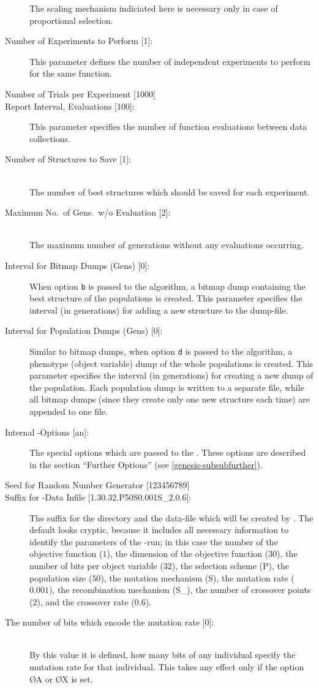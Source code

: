 \begin{description}
	The scaling mechanism indiciated here is necessary only in case of
	proportional selection.
%
\item[	Number of Experiments to Perform {[1]}:]
	This parameter defines the number of independent experiments 
	to perform for the same function.
%
\item[	Number of Trials per Experiment {[1000]}]
%
\item[	Report Interval, Evaluations {[100]}:]
	This parameter specifies the number of function evaluations
	between data collections.
%
\item[	Number of Structures to Save {[1]}:]
	\ifUS
	\mbox{}\\
	\fi
	The number of best structures which should be saved for each 
	experiment.
%
\item[	Maximum No.~of Gens.~w/o Evaluation {[2]}:] 	
	\ifUS
	\mbox{}\\
	\fi
	The maximum number of generations with\-out any evaluations occurring.
%
\item[ 	Interval for Bitmap Dumps (Gens) {[0]}:]
	When option \verb/b/ is passed to the algorithm, a bitmap dump
	containing the best structure of the populations is created.
	This parameter specifies the interval (in generations) for adding
	a new structure to the dump-file.
%
\item[	Interval for Population Dumps (Gens) {[0]}:]
	Similar to bitmap dumps, when option \verb/d/ is passed to the
	algorithm, a phenotype (object variable) dump of the whole populations
	is created.
	This parameter specifies the interval (in generations) for 
	creating a new dump of the population.
	Each population dump is written to a separate file, while all 
	bitmap dumps (since they create only one new structure each time)
	are appended to one file.
%
\item[	Internal \GA-Options {[an]}:]
	The special options which are passed to the \GA.
	These options are described in the section ``Further Options'' 
	(see \ref{genesis-subsubfurther}).
%
\item[	Seed for Random Number Generator {[123456789]}]
%
\item[	Suffix for \GA-Data Infile {[1.30.32.P50S0.001S\_2.0.6]}:]
	The suffix for the directory and the data-file which will be 
	created by \GEN. 
	The default looks cryptic, because it includes all necessary
	information to identify the parameters of the \GA-run; in this case
	the number of the objective function ($1$), the dimension of the
	objective function ($30$), the number of bits per object 
	variable ($32$), the selection scheme (P), the population
	size ($50$), the mutation mechanism (S), the mutation rate ($0.001$),
	the recombination mechanism (S\_), the number of crossover 
	points ($2$), and the crossover rate ($0.6$).
% 
\item[	The number of bits which encode the mutation rate {[0]}:]
	\ifUS
	\mbox{}\\
	\fi
	By this value it is defined, how many bits of any individual specify
	the mutation rate for that individual.
	This takes any effect only if the option \O{A} or \O{X} is set.
%
\end{description}
